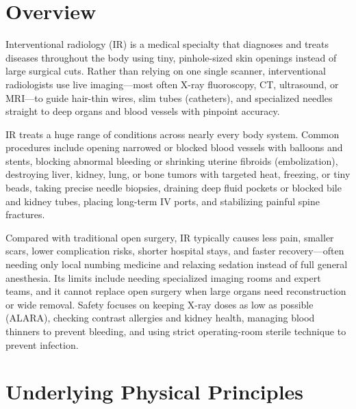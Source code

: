 \label{ch:infographic-interventional-radiology}

\section{Overview}

Interventional radiology (IR) is a medical specialty that diagnoses and treats diseases throughout the body using tiny, pinhole-sized skin openings instead of large surgical cuts. Rather than relying on one single scanner, interventional radiologists use live imaging---most often X-ray fluoroscopy, CT, ultrasound, or MRI---to guide hair-thin wires, slim tubes (catheters), and specialized needles straight to deep organs and blood vessels with pinpoint accuracy.

IR treats a huge range of conditions across nearly every body system. Common procedures include opening narrowed or blocked blood vessels with balloons and stents, blocking abnormal bleeding or shrinking uterine fibroids (embolization), destroying liver, kidney, lung, or bone tumors with targeted heat, freezing, or tiny beads, taking precise needle biopsies, draining deep fluid pockets or blocked bile and kidney tubes, placing long-term IV ports, and stabilizing painful spine fractures.

Compared with traditional open surgery, IR typically causes less pain, smaller scars, lower complication risks, shorter hospital stays, and faster recovery---often needing only local numbing medicine and relaxing sedation instead of full general anesthesia. Its limits include needing specialized imaging rooms and expert teams, and it cannot replace open surgery when large organs need reconstruction or wide removal. Safety focuses on keeping X-ray doses as low as possible (ALARA), checking contrast allergies and kidney health, managing blood thinners to prevent bleeding, and using strict operating-room sterile technique to prevent infection.

\section{Underlying Physical Principles}

